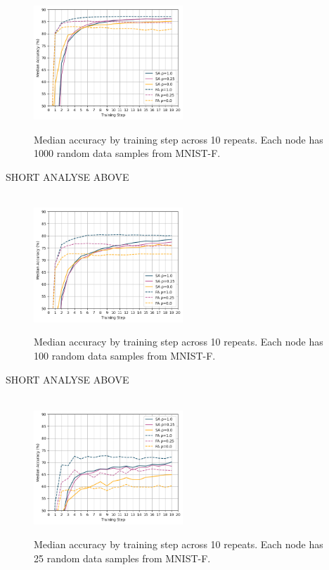 \documentclass[letterpaper, 10 pt, conference]{ieeeconf}  %
\begin{document}
\begin{figure}[H]
	 \\
	\includegraphics[width=0.5\textwidth]{conf_sparse_ns1000}
	\caption{Median accuracy by training step across 10 repeats. Each node has 1000 random data samples from MNIST-F.}
	\label{aeg4}
\end{figure}

SHORT ANALYSE ABOVE

\begin{figure}[H] 
	 \\
	\includegraphics[width=0.5\textwidth]{conf_sparse_ns100}
	\caption{Median accuracy by training step across 10 repeats. Each node has 100 random data samples from MNIST-F.}
	\label{aeg5}
\end{figure}

SHORT ANALYSE ABOVE

\begin{figure}[H] 
	 \\
	\includegraphics[width=0.5\textwidth]{conf_sparse_ns25}
	\caption{Median accuracy by training step across 10 repeats. Each node has 25 random data samples from MNIST-F.}
	\label{aeg6}
\end{figure}
\end{document}
